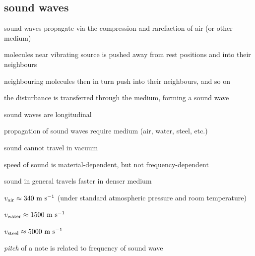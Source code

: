 \subsection{sound waves}

sound waves propagate via the compression and rarefaction of air (or other medium) 

molecules near vibrating source is pushed away from rest positions and into their neighbours

neighbouring molecules then in turn push into their neighbours, and so on

the disturbance is transferred through the medium, forming a sound wave

\cmt sound waves are longitudinal
	
\begin{figure}[ht]

\end{figure}

\cmt propagation of sound waves require medium (air, water, steel, etc.)
	
sound cannot travel in vacuum
	
\cmt speed of sound is material-dependent, but not frequency-dependent
	
	sound in general travels faster in denser medium
	
	\titem $v_\text{air} \approx 340 \text{ m s$^{-1}$}$ (under standard atmospheric pressure and room temperature)
	
	\titem $v_\text{water} \approx 1500 \text{ m s$^{-1}$}$
	
	\titem $v_\text{steel} \approx 5000 \text{ m s$^{-1}$}$
	
\cmt \emph{pitch} of a note is related to frequency of sound wave

